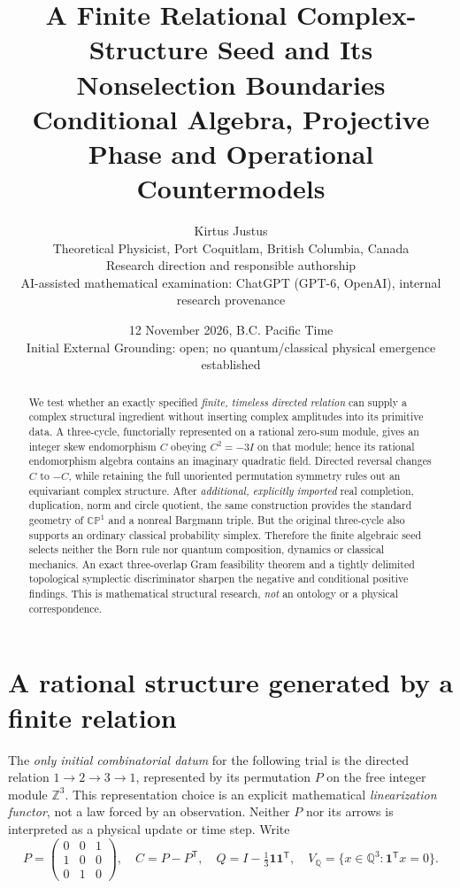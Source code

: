 \documentclass[10pt,letterpaper]{article}
\title{A Finite Relational Complex-Structure Seed and Its Nonselection Boundaries\\\large Conditional Algebra, Projective Phase and Operational Countermodels}
\author{Kirtus Justus\\\small Theoretical Physicist, Port Coquitlam, British Columbia, Canada\\\small Research direction and responsible authorship\\[2pt]\small AI-assisted mathematical examination: ChatGPT (GPT-6, OpenAI), internal research provenance}
\date{12 November 2026, B.C. Pacific Time\\\small Initial External Grounding: open; no quantum/classical physical emergence established}
\newcommand{\Q}{\mathbb Q}
\newcommand{\CP}{\mathbb{CP}}
\begin{document}
\maketitle
\begin{abstract}
We test whether an exactly specified \emph{finite, timeless directed relation} can supply a complex structural ingredient without inserting complex amplitudes into its primitive data.  A three-cycle, functorially represented on a rational zero-sum module, gives an integer skew endomorphism $C$ obeying $C^2=-3I$ on that module; hence its rational endomorphism algebra contains an imaginary quadratic field.  Directed reversal changes $C$ to $-C$, while retaining the full unoriented permutation symmetry rules out an equivariant complex structure.  After \emph{additional, explicitly imported} real completion, duplication, norm and circle quotient, the same construction provides the standard geometry of $\CP^1$ and a nonreal Bargmann triple.  But the original three-cycle also supports an ordinary classical probability simplex.  Therefore the finite algebraic seed selects neither the Born rule nor quantum composition, dynamics or classical mechanics.  An exact three-overlap Gram feasibility theorem and a tightly delimited topological symplectic discriminator sharpen the negative and conditional positive findings.  This is mathematical structural research, \emph{not} an ontology or a physical correspondence.
\end{abstract}

\section{A rational structure generated by a finite relation}
The \emph{only initial combinatorial datum} for the following trial is the directed relation $1\to2\to3\to1$, represented by its permutation $P$ on the free integer module $\mathbb Z^3$.  This representation choice is an explicit mathematical \emph{linearization functor}, not a law forced by an observation.  Neither $P$ nor its arrows is interpreted as a physical update or time step.  Write
\[
P=\begin{pmatrix}0&0&1\\1&0&0\\0&1&0\end{pmatrix},\quad
C=P-P^\mathsf{T},\quad
Q=I-\tfrac13\mathbf1\mathbf1^\mathsf{T},\quad
V_{\Q}=\{x\in\Q^3:\mathbf1^\mathsf{T}x=0\}.
\]
\end{document}
